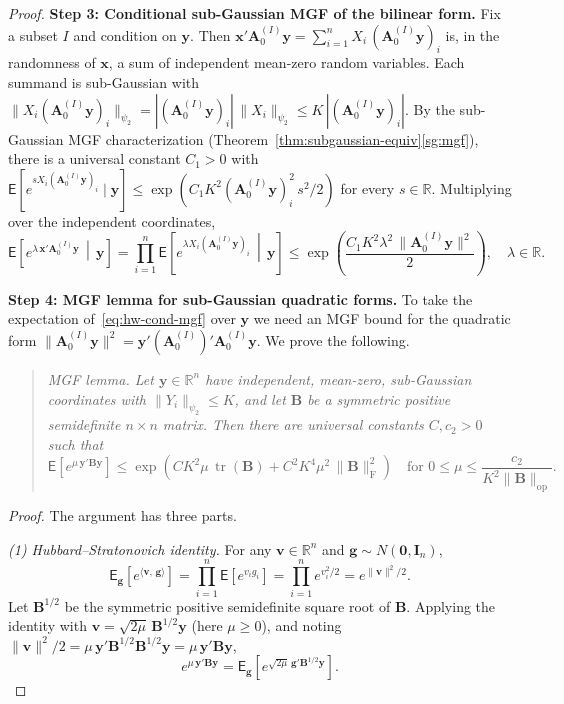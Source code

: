 \documentclass[14pt]{extarticle}
\theoremstyle{plain}
\theoremstyle{definition}
\theoremstyle{remark}
\newcommand\expc{\mathsf{E}}
\DeclareMathOperator\tr{tr}
\newcommand{\by}{\mathbf{y}}
\newcommand{\bx}{\mathbf{x}}
\newcommand{\bI}{\mathbf{I}}
\newcommand{\bzero}{\mathbf{0}}
\newcommand{\bA}{\mathbf{A}}
\newcommand{\bB}{\mathbf{B}}
\newcommand{\bg}{\mathbf{g}}
\newcommand{\bv}{\mathbf{v}}
\newcommand{\Real}{\mathbb{R}}
\newcommand{\ip}[2]{\langle #1,\, #2 \rangle}
\newcommand{\opnorm}[1]{\|#1\|_{\mathrm{op}}}
\newcommand{\fnorm}[1]{\|#1\|_{\mathrm{F}}}
\begin{document}
\begin{proof}
\textbf{Step 3: Conditional sub-Gaussian MGF of the bilinear form.} Fix a subset $I$ and condition on $\by$. Then $\bx'\bA_0^{(I)}\by = \sum_{i=1}^n X_i\,(\bA_0^{(I)}\by)_i$ is, in the randomness of $\bx$, a sum of independent mean-zero random variables. Each summand is sub-Gaussian with $\|X_i(\bA_0^{(I)}\by)_i\|_{\psi_2} = |(\bA_0^{(I)}\by)_i|\,\|X_i\|_{\psi_2} \leqslant K\,|(\bA_0^{(I)}\by)_i|$. By the sub-Gaussian MGF characterization (Theorem~\ref{thm:subgaussian-equiv}\ref{sg:mgf}), there is a universal constant $C_1 > 0$ with $\expc[e^{s X_i(\bA_0^{(I)}\by)_i} \mid \by] \leqslant \exp(C_1 K^2 (\bA_0^{(I)}\by)_i^2\, s^2/2)$ for every $s \in \Real$. Multiplying over the independent coordinates,
\begin{equation}\label{eq:hw-cond-mgf}
\expc\!\left[e^{\lambda\,\bx'\bA_0^{(I)}\by} \,\middle|\, \by\right] = \prod_{i=1}^n \expc\!\left[e^{\lambda X_i(\bA_0^{(I)}\by)_i} \,\middle|\, \by\right] \leqslant \exp\!\left(\frac{C_1 K^2 \lambda^2 \,\|\bA_0^{(I)}\by\|^2}{2}\right), \quad \lambda \in \Real.
\end{equation}

\textbf{Step 4: MGF lemma for sub-Gaussian quadratic forms.} To take the expectation of~\eqref{eq:hw-cond-mgf} over $\by$ we need an MGF bound for the quadratic form $\|\bA_0^{(I)}\by\|^2 = \by'(\bA_0^{(I)})'\bA_0^{(I)}\by$. We prove the following.

\begin{quote}
\emph{MGF lemma. Let $\by \in \Real^n$ have independent, mean-zero, sub-Gaussian coordinates with $\|Y_i\|_{\psi_2} \leqslant K$, and let $\bB$ be a symmetric positive semidefinite $n \times n$ matrix. Then there are universal constants $C, c_2 > 0$ such that}
\begin{equation}\label{eq:hw-mgf-quadratic}
\expc\!\left[e^{\mu\,\by'\bB\by}\right] \leqslant \exp\!\left(C K^2\mu\,\tr(\bB) + C^2 K^4\mu^2\,\fnorm{\bB}^2\right) \quad \text{for } 0 \leqslant \mu \leqslant \frac{c_2}{K^2\opnorm{\bB}}.
\end{equation}
\end{quote}

\emph{Proof.} The argument has three parts.

\emph{(1) Hubbard--Stratonovich identity.} For any $\bv \in \Real^n$ and $\bg \sim N(\bzero, \bI_n)$,
\[
\expc_\bg\!\left[e^{\ip{\bv}{\bg}}\right] = \prod_{i=1}^n \expc[e^{v_i g_i}] = \prod_{i=1}^n e^{v_i^2/2} = e^{\|\bv\|^2/2}.
\]
Let $\bB^{1/2}$ be the symmetric positive semidefinite square root of $\bB$. Applying the identity with $\bv = \sqrt{2\mu}\,\bB^{1/2}\by$ (here $\mu \geqslant 0$), and noting $\|\bv\|^2/2 = \mu\,\by'\bB^{1/2}\bB^{1/2}\by = \mu\,\by'\bB\by$,
\begin{equation}\label{eq:hw-hubbard}
e^{\mu\,\by'\bB\by} = \expc_\bg\!\left[e^{\sqrt{2\mu}\,\bg'\bB^{1/2}\by}\right].
\end{equation}


\end{proof}
\end{document}
